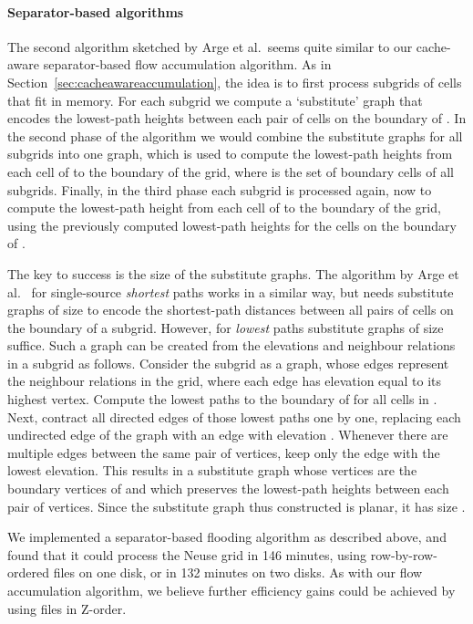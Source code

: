 \documentclass[10pt,a4paper]{article}
\begin{document}
\paragraph{Separator-based algorithms}
The second algorithm sketched by Arge et al.\ seems quite similar to our cache-aware separator-based flow accumulation algorithm. As in Section~\ref{sec:cacheawareaccumulation}, the idea is to first process subgrids of  cells that fit in memory. For each subgrid  we compute a `substitute' graph that encodes the lowest-path heights between each pair of cells on the boundary of . In the second phase of the algorithm we would combine the substitute graphs for all subgrids into one graph, which is used to compute the lowest-path heights from each cell of  to the boundary of the grid, where  is the set of boundary cells of all subgrids. Finally, in the third phase each subgrid  is processed again, now to compute the lowest-path height from each cell of  to the boundary of the grid, using the previously computed lowest-path heights for the cells on the boundary of .

The key to success is the size of the substitute graphs. The algorithm by Arge et al.~\cite{gridproblems} for single-source \emph{shortest} paths works in a similar way, but needs substitute graphs of size  to encode the shortest-path distances between all pairs of cells on the boundary of a  subgrid. However, for \emph{lowest} paths substitute graphs of size  suffice. Such a graph can be created from the elevations and neighbour relations in a subgrid  as follows. Consider the subgrid  as a graph, whose edges represent the neighbour relations in the grid, where each edge has elevation equal to its highest vertex. Compute the lowest paths to the boundary of  for all cells in . Next, contract all directed edges  of those lowest paths one by one, replacing each undirected edge  of the graph with an edge  with elevation . Whenever there are multiple edges between the same pair of vertices, keep only the edge with the lowest elevation. This results in a substitute graph whose vertices are the boundary vertices of  and which preserves the lowest-path heights between each pair of vertices. Since the substitute graph thus constructed is planar, it has size .

We implemented a separator-based flooding algorithm as described above, and found that it could process the Neuse grid in 146 minutes, using row-by-row-ordered files on one disk, or in 132 minutes on two disks. As with our flow accumulation algorithm, we believe further efficiency gains could be achieved by using files in Z-order.
\end{document}
